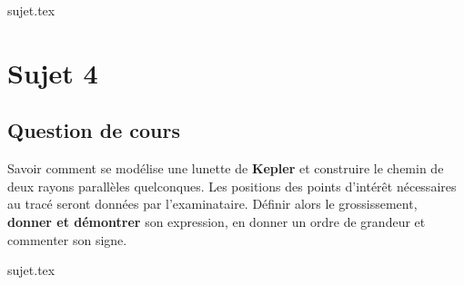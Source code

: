 \documentclass[a4paper, 11pt]{book}
\begin{document}
{sujet.tex}


\resetQ
\newpage

\chapter{Sujet 4}
\section{Question de cours}

Savoir comment se modélise une lunette de \textbf{Kepler} et construire le
chemin de deux rayons parallèles quelconques. Les positions des points d'intérêt
nécessaires au tracé seront données par l'examinataire. Définir alors le
grossissement, \textbf{donner et démontrer} son expression, en donner un ordre
de grandeur et commenter son signe.

{sujet.tex}
\end{document}
